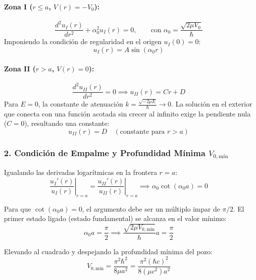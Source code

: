 \begin{problema}
\paragraph{Zona I ($r \le a$, $V(r) = -V_0$):}
\begin{equation*}
\frac{d^2 u_I(r)}{dr^2} + \alpha_0^2 u_I(r) = 0, \qquad \text{con } \alpha_0 = \frac{\sqrt{2\mu V_0}}{\hbar}
\end{equation*}
Imponiendo la condición de regularidad en el origen $u_I(0) = 0$:
\begin{equation*}
u_I(r) = A \sin(\alpha_0 r)
\end{equation*}

\paragraph{Zona II ($r > a$, $V(r) = 0$):}
\begin{equation*}
\frac{d^2 u_{II}(r)}{dr^2} = 0 \implies u_{II}(r) = C r + D
\end{equation*}
Para $E = 0$, la constante de atenuación $k = \frac{\sqrt{-2\mu E}}{\hbar} \to 0$. La solución en el exterior que conecta con una función acotada sin crecer al infinito exige la pendiente nula ($C = 0$), resultando una constante:
\begin{equation*}
u_{II}(r) = D \quad (\text{constante para } r > a)
\end{equation*}

\subsubsection*{2. Condición de Empalme y Profundidad Mínima $V_{0,\text{mín}}$}

Igualando las derivadas logarítmicas en la frontera $r = a$:
\begin{equation*}
\left. \frac{u_I'(r)}{u_I(r)} \right|_{r=a} = \left. \frac{u_{II}'(r)}{u_{II}(r)} \right|_{r=a} \implies \alpha_0 \cot(\alpha_0 a) = 0
\end{equation*}

Para que $\cot(\alpha_0 a) = 0$, el argumento debe ser un múltiplo impar de $\pi/2$. El primer estado ligado (estado fundamental) se alcanza en el valor mínimo:
\begin{equation*}
\alpha_0 a = \frac{\pi}{2} \implies \frac{\sqrt{2\mu V_{0,\text{mín}}}}{\hbar} a = \frac{\pi}{2}
\end{equation*}

Elevando al cuadrado y despejando la profundidad mínima del pozo:
\begin{equation*}
V_{0,\text{mín}} = \frac{\pi^2 \hbar^2}{8\mu a^2} = \frac{\pi^2 (\hbar c)^2}{8 (\mu c^2) a^2}
\end{equation*}


\end{problema}

